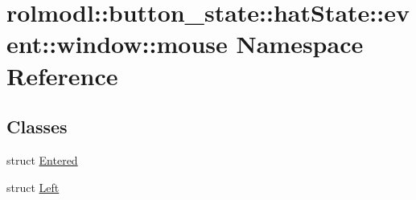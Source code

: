 \hypertarget{namespacerolmodl_1_1button__state_1_1hat_state_1_1event_1_1window_1_1mouse}{}\section{rolmodl\+::button\+\_\+state\+::hat\+State\+::event\+::window\+::mouse Namespace Reference}
\label{namespacerolmodl_1_1button__state_1_1hat_state_1_1event_1_1window_1_1mouse}
\subsection*{Classes}
\begin{DoxyCompactItemize}
\item 
struct \mbox{\hyperlink{structrolmodl_1_1button__state_1_1hat_state_1_1event_1_1window_1_1mouse_1_1_entered}{Entered}}
\item 
struct \mbox{\hyperlink{structrolmodl_1_1button__state_1_1hat_state_1_1event_1_1window_1_1mouse_1_1_left}{Left}}
\end{DoxyCompactItemize}
